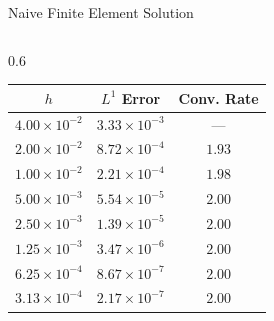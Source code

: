\documentclass{beamer}
\theoremstyle{plain}
\theoremstyle{definition}
\begin{document}
\begin{frame}{Naive Finite Element Solution}
\begin{columns}[c]
    \begin{column}{0.6\textwidth}
        {\small
        \begin{tabular}{ccc}
        \hline
        $h$ & $L^1$ Error & Conv. Rate \\
        \hline
        $4.00 \times 10^{-2}$ & $3.33 \times 10^{-3}$ & --- \\
        $2.00 \times 10^{-2}$ & $8.72 \times 10^{-4}$ & $1.93$ \\
        $1.00 \times 10^{-2}$ & $2.21 \times 10^{-4}$ & $1.98$ \\
        $5.00 \times 10^{-3}$ & $5.54 \times 10^{-5}$ & $2.00$ \\
        $2.50 \times 10^{-3}$ & $1.39 \times 10^{-5}$ & $2.00$ \\
        $1.25 \times 10^{-3}$ & $3.47 \times 10^{-6}$ & $2.00$ \\
        $6.25 \times 10^{-4}$ & $8.67 \times 10^{-7}$ & $2.00$ \\
        $3.13 \times 10^{-4}$ & $2.17 \times 10^{-7}$ & $2.00$ \\
        \hline
        \end{tabular}
        }
    \end{column}

\end{columns}

\end{frame}
\end{document}

